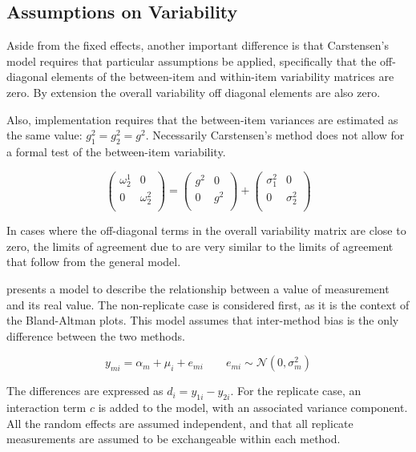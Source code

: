 \documentclass[12pt, a4paper]{report}
\theoremstyle{plain}
\theoremstyle{definition}
\theoremstyle{remark}
\begin{document}
\subsection{Assumptions on Variability}

Aside from the fixed effects, another important difference is that Carstensen's model requires that particular assumptions be applied, specifically that the off-diagonal elements of the between-item
and within-item variability matrices are zero. By extension the
overall variability off diagonal elements are also zero.

Also, implementation requires that the between-item variances are
estimated as the same value: $g^2_1 = g^2_2 = g^2$. Necessarily
Carstensen's method does not allow for a formal test of the
between-item variability.

\[\left(\begin{array}{cc}
\omega^1_2  & 0 \\
0 & \omega^2_2 \\
\end{array}  \right)
=  \left(
\begin{array}{cc}
g^2  & 0 \\
0 & g^2 \\
\end{array} \right)+
\left(
\begin{array}{cc}
\sigma^2_1  & 0 \\
0 & \sigma^2_2 \\
\end{array}\right)
\]

In cases where the off-diagonal terms in the overall variability
matrix are close to zero, the limits of agreement due to
\citet{bxc2008} are very similar to the limits of agreement that
follow from the general model.

\newpage

\citet{BXC2004} presents a model to describe the relationship between a value of measurement and its real value.
The non-replicate case is considered first, as it is the context of the Bland-Altman plots.
This model assumes that inter-method bias is the only difference between the two methods.


\begin{equation}
y_{mi}  = \alpha_{m} + \mu_{i} + e_{mi} \qquad  e_{mi} \sim \mathcal{N}(0,\sigma^{2}_{m})
\end{equation}

The differences are expressed as $d_{i} = y_{1i} - y_{2i}$.
For the replicate case, an interaction term $c$ is added to the model, with an associated variance component.
All the random effects are assumed independent, and that all replicate measurements are assumed to be exchangeable within each method.
\end{document}
